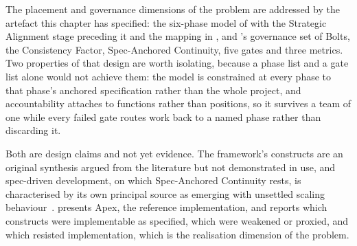 The placement and governance dimensions of the problem are addressed by the artefact this chapter has specified: the six-phase model of  with the Strategic Alignment stage preceding it and the mapping in , and 's governance set of Bolts, the Consistency Factor, Spec-Anchored Continuity, five gates and three metrics. Two properties of that design are worth isolating, because a phase list and a gate list alone would not achieve them: the model is constrained at every phase to that phase's anchored specification rather than the whole project, and accountability attaches to functions rather than positions, so it survives a team of one while every failed gate routes work back to a named phase rather than discarding it.

Both are design claims and not yet evidence. The framework's constructs are an original synthesis argued from the literature but not demonstrated in use, and spec-driven development, on which Spec-Anchored Continuity rests, is characterised by its own principal source as emerging with unsettled scaling behaviour~\cite{Thoughtworks:2025SD}.  presents Apex, the reference implementation, and reports which constructs were implementable as specified, which were weakened or proxied, and which resisted implementation, which is the realisation dimension of the problem.
